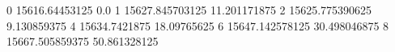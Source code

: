 0 15616.64453125 0.0
1 15627.845703125 11.201171875
2 15625.775390625 9.130859375
4 15634.7421875 18.09765625
6 15647.142578125 30.498046875
8 15667.505859375 50.861328125
